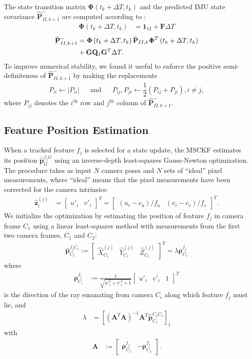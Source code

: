 \documentclass[letterpaper, 10 pt, conference]{ieeeconf}  %
\def\Vec#1{\mathbf{#1}}
\newcommand{\bbm}{\begin{bmatrix}}
\newcommand{\ebm}{\end{bmatrix}}
\begin{document}
The state transition matrix $\boldsymbol{\Phi}\left(t_k + \Delta T, t_k \right)$ and the predicted IMU state covariance $\hat{\Vec{P}}^-_{II,k+1}$ are computed according to \cite{Leutenegger:2013:RSS}:
\begin{align} \label{eq:statetransition}
	\boldsymbol{\Phi}\left(t_k + \Delta T, t_k \right) &= \Vec{1}_{12} + \Vec{F} \Delta T
\end{align}
\begin{align}
	\hat{\Vec{P}}^-_{II,k+1} &= \boldsymbol{\Phi}\left(t_k + \Delta T, t_k \right) \hat{\Vec{P}}_{II,k} \boldsymbol{\Phi}^T\left(t_k + \Delta T, t_k \right) \notag \\ &+ \Vec{G} \Vec{Q}_I \Vec{G}^T \Delta T.
\end{align}
To improve numerical stability, we found it useful to enforce the positive semi-definiteness of $\hat{\Vec{P}}^-_{II,k+1}$ by making the replacements
\begin{align*}
    P_{ii} \leftarrow |P_{ii}| && \text{and} && P_{ij}, P_{ji} \leftarrow \dfrac{1}{2}\left(P_{ij} + P_{ji}\right), i\neq j,
\end{align*}
where $P_{ij}$ denotes the $i^\text{th}$ row and $j^\text{th}$ column of $\hat{\Vec{P}}^-_{II,k+1}$.

\subsection{Feature Position Estimation}
\label{sec:featPosinvDepth}
When a tracked feature $f_j$ is selected for a state update, the MSCKF estimates its position $\hat{\Vec{p}}_G^{f_j G}$ using an inverse-depth least-squares Gauss-Newton optimization. 
The procedure takes as input $N$ camera poses and $N$ sets of ``ideal'' pixel measurements, where ``ideal'' means that the pixel measurements have been corrected for the camera intrinsics:
\begin{align}
\hat{\Vec{z}}_i^{(j)} &= \bbm u'_i & v'_i \ebm ^T = \bbm (u_i - c_u)/f_u & (v_i - c_v)/f_v \ebm ^T.
\end{align}
We initialize the optimization by estimating the position of feature $f_j$ in camera frame $C_1$ using a linear least-squares method with measurements from the first two camera frames, $C_1$ and $C_2$:
\begin{align}
\hat{\Vec{p}}_{C_1}^{f_j C_1} := \bbm \hat{X}^{(j)}_{C_1} & \hat{Y}^{(j)}_{C_1} & \hat{Z}^{(j)}_{C_1} \ebm ^T = \lambda \boldsymbol{\rho}_{C_1}^{f_j}
\end{align}
where
\begin{align}
\boldsymbol{\rho}_{C_i}^{f_j} &:= \frac{1}{\sqrt{u'^2_i + v'^2_i + 1}}\bbm u'_i & v'_i & 1\ebm^T
\end{align}
is the direction of the ray emanating from camera $C_i$ along which feature $f_j$ must lie, and
\begin{align}
\lambda &= \left[(\Vec A^T \Vec A)^{-1} \Vec A^T \hat{\Vec{p}}_{C_1}^{C_2 C_1} \right]_1
\end{align}
with
\begin{align}
\Vec A &:= \bbm \boldsymbol{\rho}_{C_1}^{f_j} & -\boldsymbol{\rho}_{C_2}^{f_j} \ebm.
\end{align}
\end{document}
